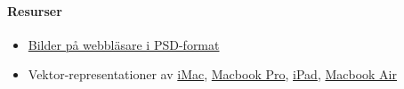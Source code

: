 \documentclass{article}
\begin{document}
      \paragraph{Resurser}
      \begin{itemize}
        \item
          \href{http://www.mohunky.com/content/public/v7/BrowserMock-upPSDs.aspx}{Bilder på webbläsare i PSD-format}
        \item
          Vektor-representationer av  
          \href{http://www.bestpsdfreebies.com/freebie/vectorized-imac/}{iMac}, 
          \href{http://www.bestpsdfreebies.com/freebie/vectorized-macbook-pro/}{Macbook Pro}, 
          \href{http://www.bestpsdfreebies.com/freebie/ipad-web-preview-mockup/}{iPad}, 
          \href{http://www.bestpsdfreebies.com/freebie/macbook-air/}{Macbook Air}
      \end{itemize}



\end{document}
